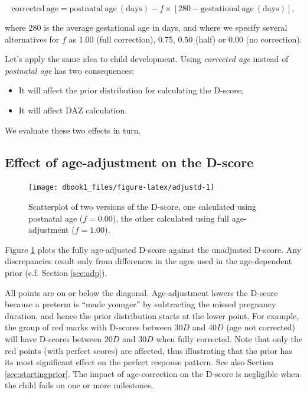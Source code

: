 \documentclass[
]{book}
\begin{document}
\[
\mathrm{corrected\ age} = \mathrm{postnatal\ age}\mathrm{\ (days)} - f \times [280 - \mathrm{gestational\ age\ (days)}],
\]

where 280 is the average gestational age in days, and where we specify several alternatives for \(f\) as 1.00 (full correction), 0.75, 0.50 (half) or 0.00 (no correction).

Let's apply the same idea to child development. Using \emph{corrected age} instead of \emph{postnatal age} has two consequences:

\begin{itemize}
\item
  It will affect the prior distribution for calculating the D-score;
\item
  It will affect DAZ calculation.
\end{itemize}

We evaluate these two effects in turn.

\hypertarget{effect-of-age-adjustment-on-the-d-score}{%
\subsection{Effect of age-adjustment on the D-score}\label{effect-of-age-adjustment-on-the-d-score}}

\begin{figure}

{\centering \texttt{[image: dbook1\_files/figure-latex/adjustd-1]} 

}

\caption{Scatterplot of two versions of the D-score, one calculated using postnatal age (\(f = 0.00\)), the other calculated using full age-adjustment (\(f = 1.00\)).}\label{fig:adjustd}
\end{figure}



Figure \ref{fig:adjustd} plots the fully age-adjusted D-score against the unadjusted D-score. Any discrepancies result only from differences in the ages used in the age-dependent prior (c.f. Section \ref{sec:adp}).

All points are on or below the diagonal. Age-adjustment lowers the D-score because a preterm is ``made younger'' by subtracting the missed pregnancy duration, and hence the prior distribution starts at the lower point. For example, the group of red marks with D-scores between 30\(D\) and 40\(D\) (age not corrected) will have D-scores between 20\(D\) and 30\(D\) when fully corrected. Note that only the red points (with perfect scores) are affected, thus illustrating that the prior has its most significant effect on the perfect response pattern. See also Section \ref{sec:startingprior}. The impact of age-correction on the D-score is negligible when the child fails on one or more milestones.
\end{document}
